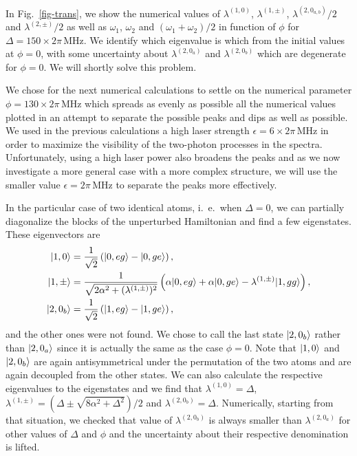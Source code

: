 In Fig.~\ref{fig-trans}, we show the numerical values of $\lambda^{(1,0)}$, $\lambda^{(1,\pm)}$, $\lambda^{(2,0_{a,b})}/2$ and $\lambda^{(2,\pm)}/2$ as well as $\omega_1$, $\omega_2$ and $(\omega_1+\omega_2)/2$ in function of $\phi$ for $\Delta=150\times 2\pi\,\mbox{MHz}$. We identify which eigenvalue is which from the initial values at $\phi=0$, with some uncertainty about $\lambda^{(2,0_{a})}$ and $\lambda^{(2,0_{b})}$ which are degenerate for $\phi=0$. We will shortly solve this problem.

We chose for the next numerical calculations to settle on the numerical parameter  $\phi=130 \times 2\pi\,\mbox{MHz}$ which spreads as evenly as possible all the numerical values plotted in an attempt to separate the possible peaks and dips as well as possible. We used in the previous calculations a high laser strength $\epsilon=6 \times 2\pi\,\mbox{MHz}$ in order to maximize the visibility of the two-photon processes in the spectra. Unfortunately, using a high laser power also broadens the peaks and as we now  investigate a more general case with a more complex structure, we will use the smaller value $\epsilon= 2\pi\,\mbox{MHz}$ to separate the peaks more effectively.

In the particular case  of two identical atoms, i.~e.~when $\Delta=0$, we can partially diagonalize the blocks of the unperturbed Hamiltonian and find a few eigenstates. These eigenvectors are
\begin{align}
| 1,0 \rangle & = \frac{1}{\sqrt 2} \left( | 0,eg \rangle  - | 0,ge \rangle \right),  \\
| 1,\pm \rangle & = \frac{1}{\sqrt{2\alpha^2 + (\lambda^{(1,\pm)})^2 }} \left( \alpha | 0,eg \rangle + \alpha | 0,ge \rangle - \lambda^{(1,\pm)} | 1,gg \rangle \right) , \\
| 2,0_b \rangle &= \frac{1}{\sqrt 2} \left( | 1,eg \rangle  - | 1,ge \rangle \right),
\end{align}
and the other ones were not found. We chose to call the last state $| 2,0_b \rangle$ rather than $| 2,0_a \rangle$ since it is actually the same as the case $\phi=0$. Note that $| 1,0 \rangle$ and $| 2,0_b \rangle$ are again antisymmetrical under the permutation of the two atoms and are again decoupled from the other states. We can also calculate the respective eigenvalues to the eigenstates and we find that $\lambda^{(1,0)} = \Delta$, $\lambda^{(1,\pm)} =( \Delta \pm \sqrt{8\alpha^2+\Delta^2})/2$ and $\lambda^{(2,0_b)}= \Delta$. Numerically, starting from that situation, we checked that value of $\lambda^{(2,0_b)}$ is always smaller than $\lambda^{(2,0_a)}$ for other values of $\Delta$ and $\phi$ and the uncertainty about their respective denomination is lifted.

